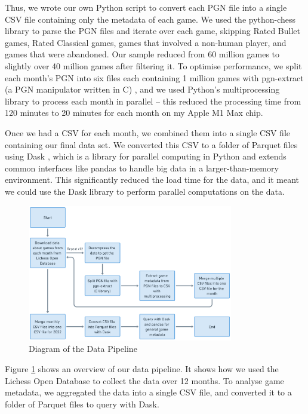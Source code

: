 \documentclass[a4paper, 11pt]{article}
\begin{document}
Thus, we wrote our own Python script to convert each PGN file into a single CSV file containing only the metadata of each game. We used the python-chess library to parse the PGN files and iterate over each game, skipping Rated Bullet games, Rated Classical games, games that involved a non-human player, and games that were abandoned. Our sample reduced from 60 million games to slightly over 40 million games after filtering it. To optimise performance, we split each month's PGN into six files each containing 1 million games with pgn-extract (a PGN manipulator written in C) \cite{pgnExtractGitHub}, and we used Python's multiprocessing library to process each month in parallel -- this reduced the processing time from 120 minutes to 20 minutes for each month on my Apple M1 Max chip.

Once we had a CSV for each month, we combined them into a single CSV file containing our final data set. We converted this CSV to a folder of Parquet files using Dask \cite{dask}, which is a library for parallel computing in Python and extends common interfaces like pandas \cite{pandas} to handle big data in a larger-than-memory environment. This significantly reduced the load time for the data, and it meant we could use the Dask library to perform parallel computations on the data.

\begin{figure}[H]
    \centering
    \caption{Diagram of the Data Pipeline}
    \label{fig:dataPipeline}
    \includegraphics[width=0.8\textwidth]{Data Pipeline.png}
\end{figure}

Figure \ref{fig:dataPipeline} shows an overview of our data pipeline. It shows how we used the Lichess Open Database to collect the data over 12 months. To analyse game metadata, we aggregated the data into a single CSV file, and converted it to a folder of Parquet files to query with Dask.
\end{document}
